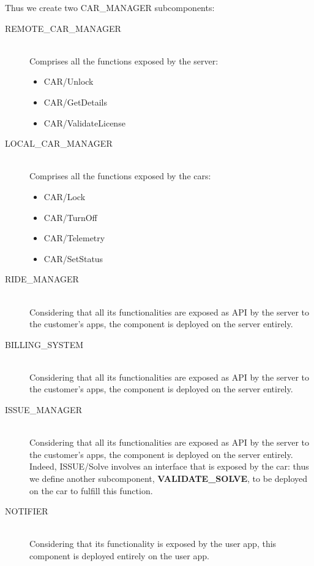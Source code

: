 \documentclass[11pt]{article} %
\begin{document}
Thus we create two CAR\_MANAGER subcomponents:
	\begin{description}
		\item[REMOTE\_CAR\_MANAGER] \hfill \\ Comprises all the functions exposed by the server:
		\begin{itemize}[noitemsep]
			\item CAR/Unlock
			\item CAR/GetDetails
			\item CAR/ValidateLicense
		\end{itemize}
		\item[LOCAL\_CAR\_MANAGER] \hfill \\ Comprises all the functions exposed by the cars:
		\begin{itemize}[noitemsep]
			\item CAR/Lock
			\item CAR/TurnOff
			\item CAR/Telemetry
			\item CAR/SetStatus
		\end{itemize}

	\item[RIDE\_MANAGER] \hfill \\
	Considering that all its functionalities are exposed as API by the server to the customer's apps, the component is deployed on the server entirely.

	\item[BILLING\_SYSTEM] \hfill \\
	Considering that all its functionalities are exposed as API by the server to the customer's apps, the component is deployed on the server entirely. 

	\item[ISSUE\_MANAGER] \hfill \\
	Considering that all its functionalities are exposed as API by the server to the customer's apps, the component is deployed on the server entirely. \\
	Indeed, ISSUE/Solve involves an interface that is exposed by the car: thus we define another subcomponent, \textbf{VALIDATE\_SOLVE}, to be deployed on the car to fulfill this function.

	\item[NOTIFIER] \hfill \\
	Considering that its functionality is exposed by the user app, this component is deployed entirely on the user app.
\end{description}
\end{document}
